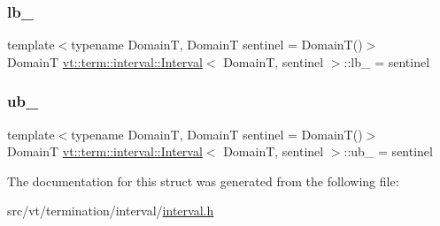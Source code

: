 \subsubsection{\texorpdfstring{lb\+\_\+}{lb\_}}
{\footnotesize\ttfamily template$<$typename DomainT, DomainT sentinel = Domain\+T()$>$ \\
DomainT \hyperlink{structvt_1_1term_1_1interval_1_1_interval}{vt\+::term\+::interval\+::\+Interval}$<$ DomainT, sentinel $>$\+::lb\+\_\+ = sentinel\hspace{0.3cm}{\ttfamily [private]}}

\mbox{\label{structvt_1_1term_1_1interval_1_1_interval_a74c71b9f525b0f282187490b2cbe3494}} 
\subsubsection{\texorpdfstring{ub\+\_\+}{ub\_}}
{\footnotesize\ttfamily template$<$typename DomainT, DomainT sentinel = Domain\+T()$>$ \\
DomainT \hyperlink{structvt_1_1term_1_1interval_1_1_interval}{vt\+::term\+::interval\+::\+Interval}$<$ DomainT, sentinel $>$\+::ub\+\_\+ = sentinel\hspace{0.3cm}{\ttfamily [private]}}



The documentation for this struct was generated from the following file\+:\begin{DoxyCompactItemize}
\item 
src/vt/termination/interval/\hyperlink{interval_8h}{interval.\+h}\end{DoxyCompactItemize}
